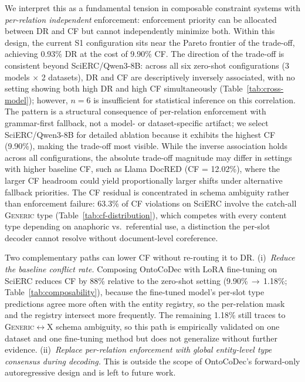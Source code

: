 We interpret this as a fundamental tension in composable constraint systems with \emph{per-relation independent} enforcement: enforcement priority can be allocated between DR and CF but cannot independently minimize both.
Within this design, the current S1 configuration sits near the Pareto frontier of the trade-off, achieving 0.93\% DR at the cost of 9.90\% CF.
The direction of the trade-off is consistent beyond SciERC/Qwen3-8B: across all six zero-shot configurations (3 models $\times$ 2 datasets), DR and CF are descriptively inversely associated, with no setting showing both high DR and high CF simultaneously (Table~\ref{tab:cross-model}); however, $n{=}6$ is insufficient for statistical inference on this correlation.
The pattern is a structural consequence of per-relation enforcement with grammar-first fallback, not a model- or dataset-specific artifact; we select SciERC/Qwen3-8B for detailed ablation because it exhibits the highest CF (9.90\%), making the trade-off most visible.
While the inverse association holds across all configurations, the absolute trade-off magnitude may differ in settings with higher baseline CF, such as Llama DocRED (CF = 12.02\%), where the larger CF headroom could yield proportionally larger shifts under alternative fallback priorities.
The CF residual is concentrated in schema ambiguity rather than enforcement failure: 63.3\% of CF violations on SciERC involve the catch-all \textsc{Generic} type (Table~\ref{tab:cf-distribution}), which competes with every content type depending on anaphoric vs.\ referential use, a distinction the per-slot decoder cannot resolve without document-level coreference.

Two complementary paths can lower CF without re-routing it to DR.
(i)~\emph{Reduce the baseline conflict rate.} Composing OntoCoDec with LoRA fine-tuning on SciERC reduces CF by 88\% relative to the zero-shot setting (9.90\%\,$\to$\,1.18\%; Table~\ref{tab:composability}), because the fine-tuned model's per-slot type predictions agree more often with the entity registry, so the per-relation mask and the registry intersect more frequently.
The remaining 1.18\% still traces to \textsc{Generic}$\leftrightarrow$X schema ambiguity, so this path is empirically validated on one dataset and one fine-tuning method but does not generalize without further evidence.
(ii)~\emph{Replace per-relation enforcement with global entity-level type consensus during decoding.} This is outside the scope of OntoCoDec's forward-only autoregressive design and is left to future work.

